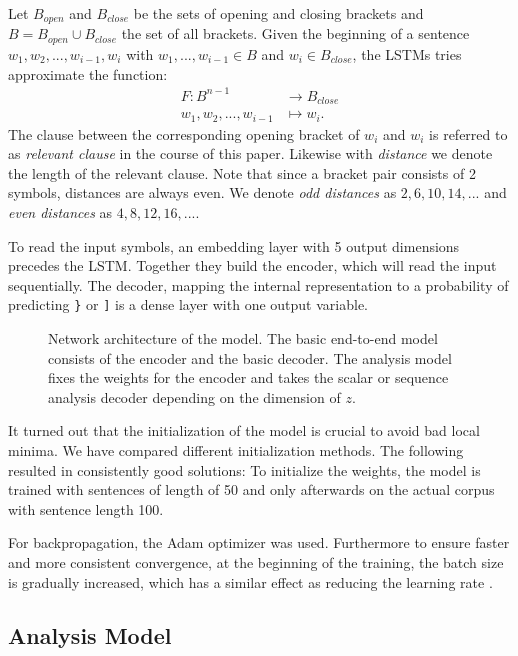 \documentclass[11pt,a4paper]{article}
\begin{document}
Let $B_{open}$ and $B_{close}$ be the sets of opening and closing brackets and $B = B_{open} \cup B_{close}$ the set of all brackets. Given the beginning of a sentence $w_1, w_2, ..., w_{i-1}, w_i$ with $w_1, ..., w_{i-1} \in B$ and $w_i \in B_{close}$, the LSTMs tries approximate the function:
%
\begin{align*}
  F \colon B^{n-1} &\to B_{close}\\
  w_1, w_2, ..., w_{i-1} &\mapsto w_i.
  \label{eq:brackets_task_definition}
\end{align*}
%
The clause between the corresponding opening bracket of $w_i$ and $w_i$ is referred to as \emph{relevant clause} in the course of this paper. Likewise with \emph{distance} we denote the length of the relevant clause. Note that since a bracket pair consists of 2 symbols, distances are always even. We denote \emph{odd distances} as ${2,6,10,14,...}$ and \emph{even distances} as ${4,8,12,16,...}$.

To read the input symbols, an embedding layer with 5 output dimensions precedes the LSTM. Together they build the encoder, which will read the input sequentially. The decoder, mapping the internal representation to a probability of predicting \verb|}| or \verb|]| is a dense layer with one output variable.

\begin{figure*}[ht]
    \centering
    
    \caption{Network architecture of the model. The basic end-to-end model consists of the encoder and the basic decoder. The analysis model fixes the weights for the encoder and takes the scalar or sequence analysis decoder depending on the dimension of $z$.}
    \label{fig:lstm_architecture}
\end{figure*}

It turned out that the initialization of the model is crucial to avoid bad local minima. We have compared different initialization methods. The following resulted in consistently good solutions: To initialize the weights, the model is trained with sentences of length of 50 and only afterwards on the actual corpus with sentence length 100.

For backpropagation, the Adam \cite{kingma2014adam} optimizer was used. Furthermore to ensure faster and more consistent convergence, at the beginning of the training, the batch size is gradually increased, which has a similar effect as reducing the learning rate \cite{smith2017don}.

\subsection{Analysis Model}
\end{document}
